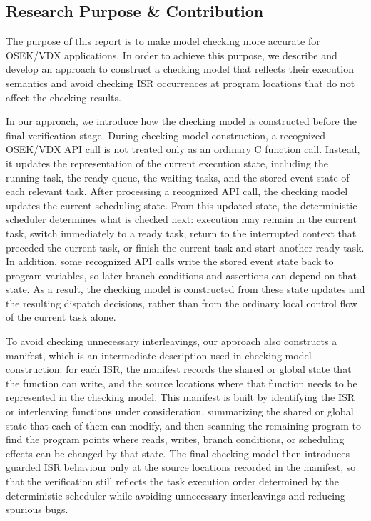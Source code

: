 \subsection{Research Purpose \& Contribution}

The purpose of this report is to make model checking more accurate for OSEK/VDX applications. In order to achieve this purpose, we describe and develop an approach to construct a checking model that reflects their execution semantics and avoid checking ISR occurrences at program locations that do not affect the checking results.

In our approach, we introduce how the checking model is constructed before the final verification stage. During checking-model construction, a recognized OSEK/VDX API call is not treated only as an ordinary C function call. Instead, it updates the representation of the current execution state, including the running task, the ready queue, the waiting tasks, and the stored event state of each relevant task. After processing a recognized API call, the checking model updates the current scheduling state. From this updated state, the deterministic scheduler determines what is checked next: execution may remain in the current task, switch immediately to a ready task, return to the interrupted context that preceded the current task, or finish the current task and start another ready task. In addition, some recognized API calls write the stored event state back to program variables, so later branch conditions and assertions can depend on that state. As a result, the checking model is constructed from these state updates and the resulting dispatch decisions, rather than from the ordinary local control flow of the current task alone.

To avoid checking unnecessary interleavings, our approach also constructs a manifest, which is an intermediate description used in checking-model construction: for each ISR, the manifest records the shared or global state that the function can write, and the source locations where that function needs to be represented in the checking model. This manifest is built by identifying the ISR or interleaving functions under consideration, summarizing the shared or global state that each of them can modify, and then scanning the remaining program to find the program points where reads, writes, branch conditions, or scheduling effects can be changed by that state. The final checking model then introduces guarded ISR behaviour only at the source locations recorded in the manifest, so that the verification still reflects the task execution order determined by the deterministic scheduler while avoiding unnecessary interleavings and reducing spurious bugs.

